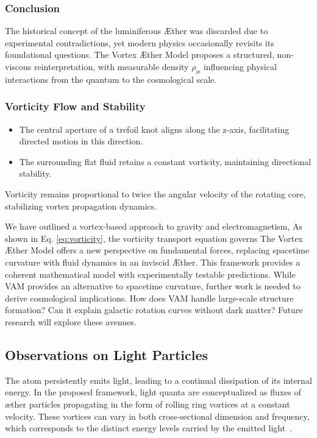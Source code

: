 \documentclass[a4paper,10pt]{article}
\begin{document}
\subsubsection*{Conclusion}
The historical concept of the luminiferous Æther was discarded due to experimental contradictions, yet modern physics occasionally revisits its foundational questions. The Vortex Æther Model proposes a structured, non-viscous reinterpretation, with measurable density $ \rho_\text{\ae} $ influencing physical interactions from the quantum to the cosmological scale.




\subsubsection*{Vorticity Flow and Stability}

\begin{itemize}
    \item The central aperture of a trefoil knot aligns along the z-axis, facilitating directed motion in this direction.
    \item The surrounding flat fluid retains a constant vorticity, maintaining directional stability.
\end{itemize}
Vorticity remains proportional to twice the angular velocity of the rotating core, stabilizing vortex propagation dynamics.

We have outlined a vortex-based approach to gravity and electromagnetism, As shown in Eq. \eqref{eq:vorticity}, the vorticity transport equation governs  The Vortex Æther Model offers a new perspective on fundamental forces,
replacing spacetime curvature with fluid dynamics in an inviscid Æther.
This framework provides a coherent mathematical model with experimentally testable predictions.
While VAM provides an alternative to spacetime curvature, further work is needed to derive cosmological implications.
How does VAM handle large-scale structure formation?
Can it explain galactic rotation curves without dark matter?
Future research will explore these avenues.

    

\subsection{Observations on Light Particles}\label{subsec:observations-on-light-particles}
The atom persistently emits light, leading to a continual dissipation of its internal energy.
In the proposed framework, light quanta are conceptualized as fluxes of æther particles propagating in the form of rolling ring vortices at a constant velocity.
These vortices can vary in both cross-sectional dimension and frequency, which corresponds to the distinct energy levels carried by the emitted light~\cite{helmholtz1858, kelvin1867}.
\end{document}
